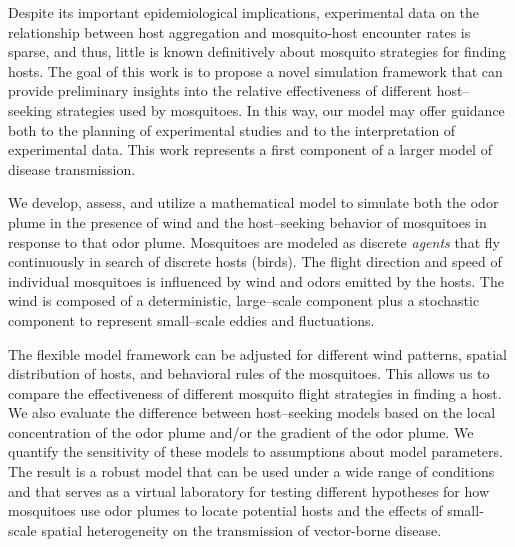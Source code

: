 \documentclass[10pt]{article}
\begin{document}
Despite its important epidemiological implications, experimental data on the relationship between host aggregation and mosquito-host encounter rates is sparse, and thus, little is known definitively about mosquito strategies for finding hosts.
The goal of this work is to propose a novel simulation framework that can 
provide preliminary insights into the relative effectiveness of different host--seeking strategies used by mosquitoes.  
In this way, our model may offer guidance both to the planning of experimental
studies and to the interpretation of experimental data.  This work represents a first component
of  a larger model of disease transmission.

We develop, assess, and utilize a mathematical model
to simulate  both the odor plume in the presence of wind and the host--seeking behavior of mosquitoes in response to that odor plume. Mosquitoes are modeled as discrete \textit{agents} that fly continuously in search of  discrete hosts (birds).
The flight direction and speed of individual mosquitoes is influenced by wind and odors
emitted by the hosts.
The wind is composed of a deterministic, large--scale component plus
a stochastic component to represent small--scale eddies and fluctuations.

The flexible  model framework  can be adjusted for different wind patterns, spatial distribution of hosts, and behavioral rules of the mosquitoes.  This allows us to compare the effectiveness of different mosquito flight strategies in finding a host.  We also evaluate the difference between host--seeking models based on the local concentration of the odor plume and/or the gradient of the odor plume. We
quantify the sensitivity of these models to assumptions about model parameters.
The result is a robust model that can be used under a wide range of conditions and that serves as a virtual laboratory for testing different hypotheses for how mosquitoes use odor plumes to locate potential hosts and the effects of small-scale spatial heterogeneity on the transmission of vector-borne disease.
\end{document}

